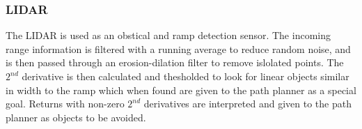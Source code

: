 \subsubsection{LIDAR}

The LIDAR is used as an obstical and ramp detection sensor. The incoming range information is filtered with a running average to reduce random noise, and is then passed through an erosion-dilation filter to remove islolated points. The $2^{nd}$ derivative is then calculated and thesholded to look for linear objects similar in width to the ramp which when found are given to the path planner as a special goal. Returns with non-zero $2^{nd}$ derivatives are interpreted and given to the path planner as objects to be avoided.
